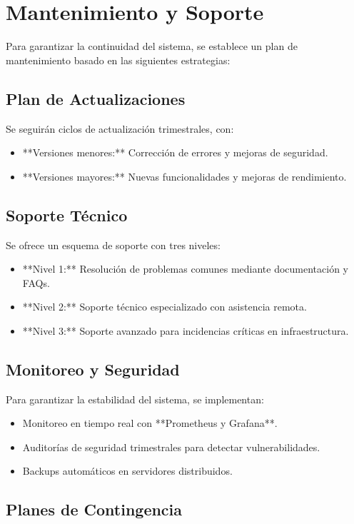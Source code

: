 \chapter{Mantenimiento y Soporte}


Para garantizar la continuidad del sistema, se establece un plan de mantenimiento basado en las siguientes estrategias:

\section{Plan de Actualizaciones}
Se seguirán ciclos de actualización trimestrales, con:
\begin{itemize}
	\item **Versiones menores:** Corrección de errores y mejoras de seguridad.
	\item **Versiones mayores:** Nuevas funcionalidades y mejoras de rendimiento.
\end{itemize}

\section{Soporte Técnico}
Se ofrece un esquema de soporte con tres niveles:
\begin{itemize}
	\item **Nivel 1:** Resolución de problemas comunes mediante documentación y FAQs.
	\item **Nivel 2:** Soporte técnico especializado con asistencia remota.
	\item **Nivel 3:** Soporte avanzado para incidencias críticas en infraestructura.
\end{itemize}

\section{Monitoreo y Seguridad}
Para garantizar la estabilidad del sistema, se implementan:
\begin{itemize}
	\item Monitoreo en tiempo real con **Prometheus y Grafana**.
	\item Auditorías de seguridad trimestrales para detectar vulnerabilidades.
	\item Backups automáticos en servidores distribuidos.
\end{itemize}

\section{Planes de Contingencia}

